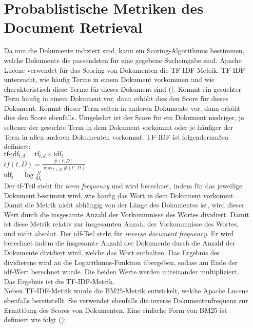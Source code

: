 \section{Probablistische Metriken des Document Retrieval}
Da nun die Dokumente indiziert sind, kann ein Scoring-Algorithmus bestimmen, welche Dokumente die passendsten für eine gegebene Sucheingabe sind.
Apache Lucene verwendet für das Scoring von Dokumenten die TF-IDF Metrik.
TF-IDF untersucht, wie häufig Terme in einem Dokument vorkommen und wie charakteristisch diese Terme für dieses Dokument sind (\cite{Manning_Raghavan_Schuetze_2019}).
Kommt ein gesuchter Term häufig in einem Dokument vor, dann erhöht dies den Score für dieses Dokument.
Kommt dieser Term selten in anderen Dokumente vor, dann erhöht dies den Score ebenfalls.
Umgekehrt ist der Score für ein Dokument niedriger, je seltener der gesuchte Term in dem Dokument vorkommt oder je häufiger der Term in allen anderen Dokumenten vorkommt.
TF-IDF ist folgendermaßen definiert:\\

\(\text{tf-idf}_{t,d}=\text{tf}_{t,d} \times \text{idf}_t\)\\

\(tf(t,D)=\frac {\#(t,D)}{\max _{t'\in D}\#(t',D)}\)\\

\(\text{idf}_t=\log {\frac {N}{\text{df}_t}}\)\\

Der tf-Teil steht für \textit{term frequency} und wird berechnet, indem für das jeweilige Dokument bestimmt wird, wie häufig das Wort in dem Dokument vorkommt.
Damit die Metrik nicht abhängig von der Länge des Dokumentes ist, wird dieser Wert durch die insgesamte Anzahl der Vorkommnisse des Wortes dividiert.
Damit ist diese Metrik relativ zur insgesamten Anzahl der Vorkommnisse des Wortes, und nicht absolut.
Der idf-Teil steht für \textit{inverse document frequency}.
Er wird berechnet indem die insgesamte Anzahl der Dokumente durch die Anzahl der Dokumente dividiert wird, welche das Wort enthalten.
Das Ergebnis des dividierens wird an die Logarithmus-Funktion übergeben, sodass am Ende der idf-Wert berechnet wurde.
Die beiden Werte werden miteinander multipliziert.
Das Ergebnis ist die TF-IDF-Metrik.\\

Neben TF-IDF-Metrik wurde die BM25-Metrik entwickelt, welche Apache Lucene ebenfalls bereitstellt.
Sie verwendet ebenfalls die inverse Dokumentenfrequenz zur Ermittlung des Scores von Dokumenten.
Eine einfache Form von BM25 ist definiert wie folgt (\cite{Beaulieu_Track_Sparck_Karen_Willett_Peter}):\\

